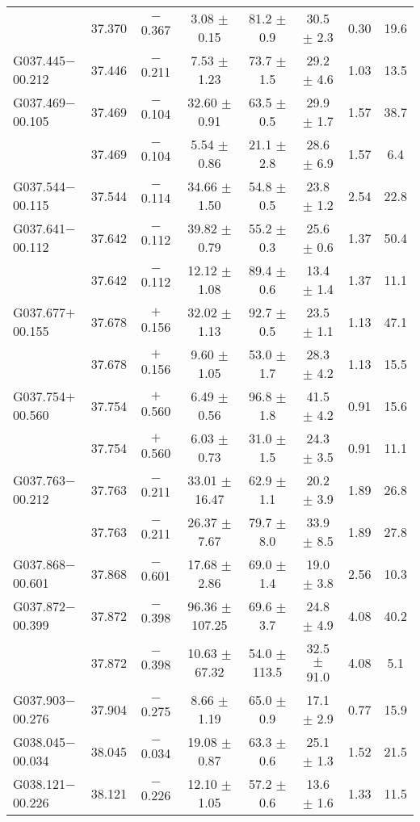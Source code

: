 \begin{ThreePartTable}
\begin{longtable}{lccccccc}
                      &37.370&	$-$0.367	&3.08	$\pm$ 0.15	&81.2	$\pm$ 0.9	&30.5	$\pm$ 2.3	&0.30	&19.6\\
G037.445$-$00.212     &37.446&	$-$0.211	&7.53	$\pm$ 1.23	&73.7	$\pm$ 1.5	&29.2	$\pm$ 4.6	&1.03	&13.5\\
G037.469$-$00.105     &37.469&	$-$0.104	&32.60	$\pm$ 0.91	&63.5	$\pm$ 0.5	&29.9	$\pm$ 1.7	&1.57	&38.7\\
                      &37.469&	$-$0.104	&5.54	$\pm$ 0.86	&21.1	$\pm$ 2.8	&28.6	$\pm$ 6.9	&1.57	&6.4\\
G037.544$-$00.115     &37.544&	$-$0.114	&34.66	$\pm$ 1.50	&54.8	$\pm$ 0.5	&23.8	$\pm$ 1.2	&2.54	&22.8\\
G037.641$-$00.112     &37.642&	$-$0.112	&39.82	$\pm$ 0.79	&55.2	$\pm$ 0.3	&25.6	$\pm$ 0.6	&1.37	&50.4\\
                      &37.642&	$-$0.112	&12.12	$\pm$ 1.08	&89.4	$\pm$ 0.6	&13.4	$\pm$ 1.4	&1.37	&11.1\\
G037.677$+$00.155     &37.678&	$+$0.156	&32.02	$\pm$ 1.13	&92.7	$\pm$ 0.5	&23.5	$\pm$ 1.1	&1.13	&47.1\\
                      &37.678&	$+$0.156	&9.60	$\pm$ 1.05	&53.0	$\pm$ 1.7	&28.3	$\pm$ 4.2	&1.13	&15.5\\
G037.754$+$00.560     &37.754&	$+$0.560	&6.49	$\pm$ 0.56	&96.8	$\pm$ 1.8	&41.5	$\pm$ 4.2	&0.91	&15.6\\
                      &37.754&	$+$0.560	&6.03	$\pm$ 0.73	&31.0	$\pm$ 1.5	&24.3	$\pm$ 3.5	&0.91	&11.1\\
G037.763$-$00.212     &37.763&	$-$0.211	&33.01	$\pm$ 16.47	&62.9	$\pm$ 1.1	&20.2	$\pm$ 3.9	&1.89	&26.8\\
                      &37.763&	$-$0.211	&26.37	$\pm$ 7.67	&79.7	$\pm$ 8.0	&33.9	$\pm$ 8.5	&1.89	&27.8\\
G037.868$-$00.601     &37.868&	$-$0.601	&17.68	$\pm$ 2.86	&69.0	$\pm$ 1.4	&19.0	$\pm$ 3.8	&2.56	&10.3\\
G037.872$-$00.399     &37.872&	$-$0.398	&96.36	$\pm$ 107.25	&69.6	$\pm$ 3.7	&24.8	$\pm$ 4.9	&4.08	&40.2\\
                      &37.872&	$-$0.398	&10.63	$\pm$ 67.32	&54.0	$\pm$ 113.5	&32.5	$\pm$ 91.0	&4.08	&5.1\\
G037.903$-$00.276     &37.904&	$-$0.275	&8.66	$\pm$ 1.19	&65.0	$\pm$ 0.9	&17.1	$\pm$ 2.9	&0.77	&15.9\\
G038.045$-$00.034     &38.045&	$-$0.034	&19.08	$\pm$ 0.87	&63.3	$\pm$ 0.6	&25.1	$\pm$ 1.3	&1.52	&21.5\\
G038.121$-$00.226     &38.121&	$-$0.226	&12.10	$\pm$ 1.05	&57.2	$\pm$ 0.6	&13.6	$\pm$ 1.6	&1.33	&11.5\\

\end{longtable}
\end{ThreePartTable}
